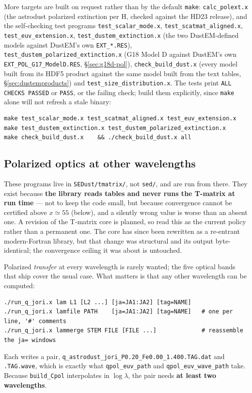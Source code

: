 \documentclass{my_memo}
\newcommand{\code}[1]{\texttt{#1}}
\begin{document}
More targets are built on request rather than by the default \code{make}:
\code{calc\_polext.x} (the astrodust polarized extinction per H, checked
against the HD23 release), and the self-checking test programs
\code{test\_scalar\_mode.x}, \code{test\_scatmat\_aligned.x},
\code{test\_euv\_extension.x}, \code{test\_dustem\_extinction.x} (the two
DustEM-defined models against DustEM's own \code{EXT\_*.RES}),
\code{test\_dustem\_polarized\_extinction.x} (G18 Model D against DustEM's own
\code{EXT\_POL\_G17\_ModelD.RES}, \S\ref{sec:g18d-pol}),
\code{check\_build\_dust.x} (every model built from its HDF5 product against
the same model built from the text tables, \S\ref{sec:dustemproducts}) and
\code{test\_size\_distribution.x}. The tests
print \code{ALL CHECKS PASSED} or \code{PASS}, or the failing check; build them
explicitly, since \code{make} alone will not refresh a stale binary:
\begin{lstlisting}[style=sh]
make test_scalar_mode.x test_scatmat_aligned.x test_euv_extension.x
make test_dustem_extinction.x test_dustem_polarized_extinction.x
make check_build_dust.x    && ./check_build_dust.x all
\end{lstlisting}

\subsection{Polarized optics at other wavelengths}\label{sec:standalone:qjori}

These programs live in \code{SEDust/tmatrix/}, not \code{sed/}, and are run from
there. They exist because \textbf{the library reads tables and never runs the
T-matrix at run time} --- not to keep the code small, but because convergence
cannot be certified above $x\simeq55$ (below), and a silently wrong value is
worse than an absent one. A revision of the T-matrix core is planned, so read
this as the current policy rather than a permanent one. The core has since been
rewritten as a re-entrant modern-Fortran library, but that change was structural
and its output byte-identical; the convergence ceiling it was about is untouched.

Polarized \emph{transfer} at every wavelength is rarely wanted; the five optical
bands that ship cover the usual case. What matters is that any other wavelength
can be computed:
\begin{lstlisting}[style=sh]
./run_q_jori.x lam L1 [L2 ...] [ja=JA1:JA2] [tag=NAME]
./run_q_jori.x lamfile PATH    [ja=JA1:JA2] [tag=NAME]   # one per line, '#' comments
./run_q_jori.x lammerge STEM FILE [FILE ...]             # reassemble the ja= windows
\end{lstlisting}
Each writes a pair,
\code{q\_astrodust\_jori\_P0.20\_Fe0.00\_1.400.TAG.dat} and \code{.TAG.wave},
which is exactly what \code{qpol\_euv\_path} and \code{qpol\_euv\_wave\_path}
take. Because \code{build\_Cpol} interpolates in $\log\lambda$, the pair needs
\textbf{at least two wavelengths}.
\end{document}
